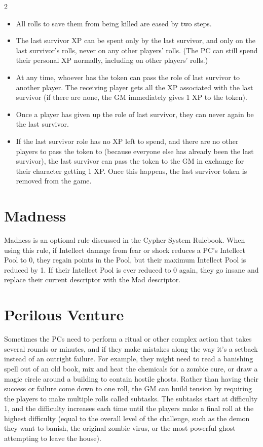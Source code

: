 \begin{multicols}{2}
\begin{itemize}
\item All rolls to save them from being killed are eased by two steps.
\item The last survivor XP can be spent only by the last survivor, and only on the last survivor’s rolls, never on any other players’ rolls. (The PC can still spend their personal XP normally, including on other players’ rolls.)
\item At any time, whoever has the token can pass the role of last survivor to another player. The receiving player gets all the XP associated with the last survivor (if there are none, the GM immediately gives 1 XP to the token).
\item Once a player has given up the role of last survivor, they can never again be the last survivor.
\item If the last survivor role has no XP left to spend, and there are no other players to pass the token to (because everyone else has already been the last survivor), the last survivor can pass the token to the GM in exchange for their character getting 1 XP. Once this happens, the last survivor token is removed from the game.
\end{itemize}

\section{Madness}

Madness is an optional rule discussed in the Cypher System Rulebook. When using this rule, if Intellect damage from fear or shock reduces a PC’s Intellect Pool to 0, they regain points in the Pool, but their maximum Intellect Pool is reduced by 1. If their Intellect Pool is ever reduced to 0 again, they go insane and replace their current descriptor with the Mad descriptor.

\section{Perilous Venture}

Sometimes the PCs need to perform a ritual or other complex action that takes several rounds or minutes, and if they make mistakes along the way it’s a setback instead of an outright failure. For example, they might need to read a banishing spell out of an old book, mix and heat the chemicals for a zombie cure, or draw a magic circle around a building to contain hostile ghosts. Rather than having their success or failure come down to one roll, the GM can build tension by requiring the players to make multiple rolls called subtasks. The subtasks start at difficulty 1, and the difficulty increases each time until the players make a final roll at the highest difficulty (equal to the overall level of the challenge, such as the demon they want to banish, the original zombie virus, or the most powerful ghost attempting to leave the house).


\end{multicols}
